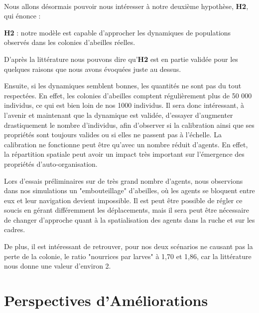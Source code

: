 	\paragraph{}
		Nous allons désormais pouvoir nous intéresser à notre deuxième hypothèse, \textbf{H2}, qui énonce : 
		
		 \textbf{H2} : notre modèle est capable d'approcher les dynamiques de populations observés dans les colonies d'abeilles réelles.
		 
		 D'après la littérature nous pouvons dire qu'\textbf{H2} est en partie validée pour les quelques raisons que nous avons évoquées juste au dessus. 
		 
		 Ensuite, si les dynamiques semblent bonnes, les quantités ne sont pas du tout respectées. En effet, les colonies d'abeilles comptent régulièrement plus de 50 000 individus, ce qui est bien loin de nos 1000 individus. Il sera donc intéressant, à l'avenir et maintenant que la dynamique est validée, d'essayer d'augmenter drastiquement le nombre d'individus, afin d'observer si la calibration ainsi que ses propriétés sont toujours valides ou si elles ne passent pas à l'échelle. La calibration ne fonctionne peut être qu'avec un nombre réduit d'agents. En effet, la répartition spatiale peut avoir un impact très important sur l'émergence des propriétés d'auto-organisation. 
		 
		 Lors d'essais préliminaires sur de très grand nombre d'agents, nous observions dans nos simulations un "embouteillage" d'abeilles, où les agents se bloquent entre eux et leur navigation devient impossible. Il est peut être possible de régler ce soucis en gérant différemment les déplacements, mais il sera peut être nécessaire de changer d'approche quant à la spatialisation des agents dans la ruche et sur les cadres.
		 
		 De plus, il est intéressant de retrouver, pour nos deux scénarios ne causant pas la perte de la colonie, le ratio "nourrices par larves" à 1,70 et 1,86, car la littérature nous donne une valeur d'environ 2.
	
	
	\section{Perspectives d'Améliorations}
	\label{sectionPerspectivesSMA}
	
